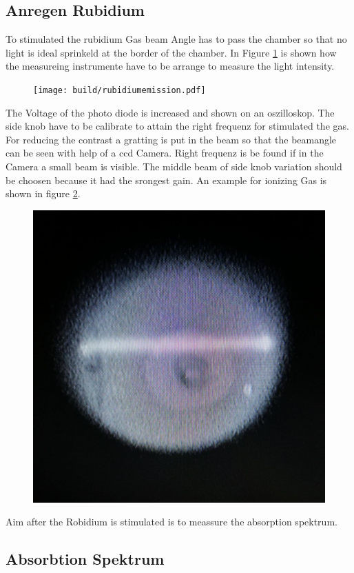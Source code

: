 \subsection{Anregen Rubidium}%
\label{sub:anregen_rubidium}

To stimulated the rubidium Gas beam Angle has to pass the chamber so that no
light is ideal sprinkeld at the border of the chamber. 
In Figure \ref{fig:hole_emission} is shown how the measureing instrumente have to be
arrange to measure the light intensity.
\begin{figure}[h]
		\centering
		\texttt{[image: build/rubidiumemission.pdf]}
		\caption{}
		\label{fig:hole_emission}
\end{figure}
The Voltage of the photo diode is increased and shown on an oszilloskop. 
The side knob have to be calibrate to attain the right frequenz for stimulated
the gas. 
For reducing the contrast a gratting is put in the beam so that the beamangle
can be seen with help of a ccd Camera. 
Right frequenz is be found if in the Camera a small beam is visible. 
The middle beam of side knob variation should be choosen because it had the
srongest gain.
An example for ionizing Gas is shown in figure \ref{fig:ionized}.
\begin{figure}[h]
		\centering
		\includegraphics[width=0.4\linewidth]{./content/pictures/fluorescence.jpg}
		\caption{}
		\label{fig:ionized}
\end{figure}
Aim after the Robidium is stimulated is to meassure the absorption spektrum. 

\subsection{Absorbtion Spektrum}%
\label{sub:absorbtion_spektrum}

